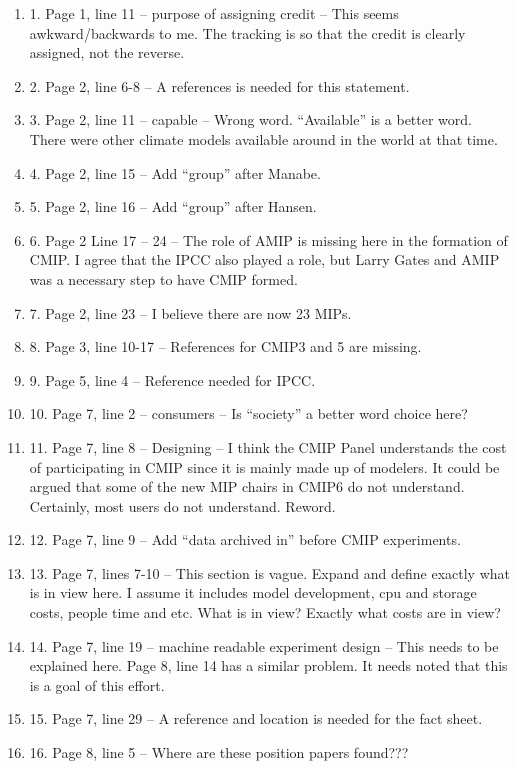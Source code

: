 \documentclass[gmd,manuscript]{copernicus}
\begin{document}
\begin{enumerate}[label=RC1-\arabic*,leftmargin=*]
\item 1. Page 1, line 11 – purpose of assigning credit – This seems
  awkward/backwards to me. The tracking is so that the credit is
  clearly assigned, not the reverse.
\item 2. Page 2, line 6-8 – A references is needed for this statement.
\item 3. Page 2, line 11 – capable – Wrong word. “Available” is a
  better word. There were other climate models available around in the
  world at that time.
\item 4. Page 2, line 15 – Add “group” after Manabe.
\item 5. Page 2, line 16 – Add “group” after Hansen.
\item 6. Page 2 Line 17 – 24 – The role of AMIP is missing here in the
  formation of CMIP. I agree that the IPCC also played a role, but
  Larry Gates and AMIP was a necessary step to have CMIP formed.
\item 7. Page 2, line 23 – I believe there are now 23 MIPs.
\item 8. Page 3, line 10-17 – References for CMIP3 and 5 are missing.
\item 9. Page 5, line 4 – Reference needed for IPCC.
\item 10. Page 7, line 2 – consumers – Is “society” a better word
  choice here?
\item 11. Page 7, line 8 – Designing – I think the CMIP Panel
  understands the cost of participating in CMIP since it is mainly
  made up of modelers. It could be argued that some of the new MIP
  chairs in CMIP6 do not understand. Certainly, most users do not
  understand. Reword.
\item 12. Page 7, line 9 – Add “data archived in” before CMIP
  experiments.
\item 13. Page 7, lines 7-10 – This section is vague. Expand and
  define exactly what is in view here. I assume it includes model
  development, cpu and storage costs, people time and etc. What is in
  view? Exactly what costs are in view?
\item 14. Page 7, line 19 – machine readable experiment design – This
  needs to be explained here. Page 8, line 14 has a similar problem.
  It needs noted that this is a goal of this effort.
\item 15. Page 7, line 29 – A reference and location is needed for the
  fact sheet.
\item 16. Page 8, line 5 – Where are these position papers found???

\end{enumerate}
\end{document}
